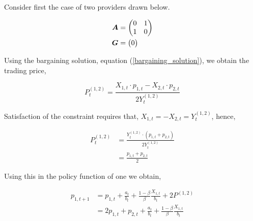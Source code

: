 Consider first the case of two providers drawn below.

\vspace{5mm}
\begin{minipage}{.5\textwidth}
    \resizebox{\textwidth}{!}{}
\end{minipage}
\begin{minipage}{.45\textwidth}
    \begin{equation*}
        \begin{split}
            \bm{A} &= \begin{pmatrix}
                0 & 1 \\
                1 & 0
            \end{pmatrix} \\
            \bm{G} &= \begin{pmatrix}
                0
            \end{pmatrix}
        \end{split}
    \end{equation*}
\end{minipage}
\vspace{5mm}

Using the bargaining solution, equation (\ref{bargaining_solution}), we obtain the trading price,

\begin{equation}
    P^{(1, 2)}_t = \frac{X_{1, t} \cdot p_{1, t} - X_{2, t} \cdot p_{2, t}}{2 Y^{(1, 2)}_t}
\end{equation}

Satisfaction of the constraint requires that, $X_{1, t} = - X_{2, t} = Y^{(1, 2)}_t$, hence,

\begin{equation}
    \begin{split}
        P^{(1, 2)}_t &= \frac{Y^{(1, 2)}_t \cdot \left( p_{1, t} + p_{2, t} \right)}{2  Y^{(1, 2)}_t} \\
        &= \frac{p_{1, t} + p_{2, t}}{2}
    \end{split}
\end{equation}

Using this in the policy function of one we obtain,

\begin{equation*}
    \begin{split}
        p_{1, t+1} &= p_{1, t} + \frac{a_t}{b_t} + \frac{1 - \beta}{\beta} \frac{X_{1, t}}{b_t} + 2P^{(1, 2)} \\
        &= 2p_{1, t} + p_{2, t} + \frac{a_t}{b_t} + \frac{1 - \beta}{\beta} \frac{X_{1, t}}{b_t}
    \end{split}
\end{equation*}
